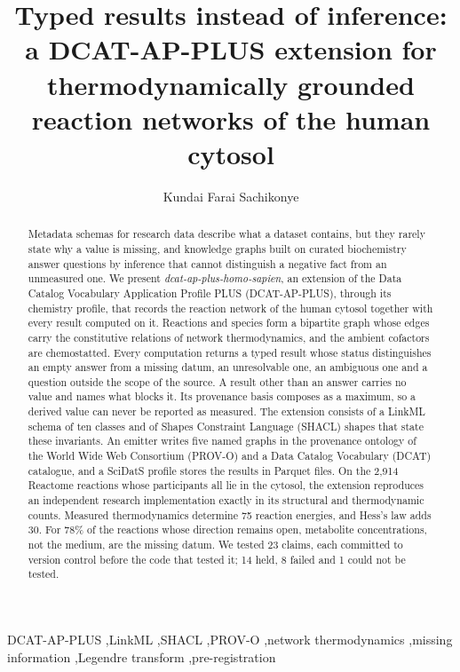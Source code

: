 \documentclass[5p]{elsarticle}
\theoremstyle{definition}
\theoremstyle{plain}
\begin{document}
\begin{frontmatter}

\title{Typed results instead of inference: a DCAT-AP-PLUS extension for thermodynamically grounded reaction networks of the human cytosol}

\author{Kundai Farai Sachikonye}
\address{University of Greifswald, and NFDI4Cat, the National Research Data Infrastructure for Catalysis-Related Sciences, Germany}

\begin{abstract}
Metadata schemas for research data describe what a dataset contains, but they rarely state why a value is missing, and knowledge graphs built on curated biochemistry answer questions by inference that cannot distinguish a negative fact from an unmeasured one.
We present \emph{dcat-ap-plus-homo-sapien}, an extension of the Data Catalog Vocabulary Application Profile PLUS (DCAT-AP-PLUS), through its chemistry profile, that records the reaction network of the human cytosol together with every result computed on it.
Reactions and species form a bipartite graph whose edges carry the constitutive relations of network thermodynamics, and the ambient cofactors are chemostatted.
Every computation returns a typed result whose status distinguishes an empty answer from a missing datum, an unresolvable one, an ambiguous one and a question outside the scope of the source.
A result other than an answer carries no value and names what blocks it.
Its provenance basis composes as a maximum, so a derived value can never be reported as measured.
The extension consists of a LinkML schema of ten classes and of Shapes Constraint Language (SHACL) shapes that state these invariants.
An emitter writes five named graphs in the provenance ontology of the World Wide Web Consortium (PROV-O) and a Data Catalog Vocabulary (DCAT) catalogue, and a SciDatS profile stores the results in Parquet files.
On the 2{,}914 Reactome reactions whose participants all lie in the cytosol, the extension reproduces an independent research implementation exactly in its structural and thermodynamic counts.
Measured thermodynamics determine 75 reaction energies, and Hess's law adds 30.
For 78\% of the reactions whose direction remains open, metabolite concentrations, not the medium, are the missing datum.
We tested 23 claims, each committed to version control before the code that tested it; 14 held, 8 failed and 1 could not be tested.
\end{abstract}

\begin{keyword}
DCAT-AP-PLUS \sep LinkML \sep SHACL \sep PROV-O \sep network thermodynamics \sep missing information \sep Legendre transform \sep pre-registration
\end{keyword}

\end{frontmatter}
\end{document}
